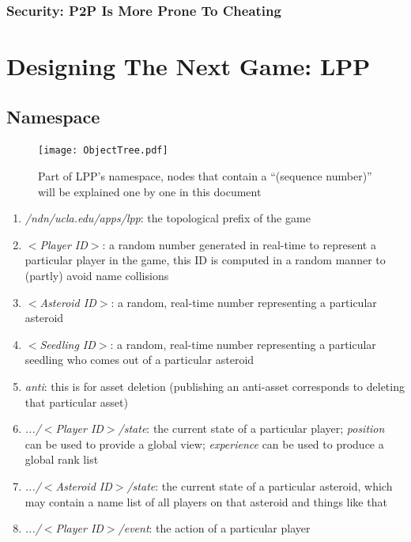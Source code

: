 \documentclass{article}
\begin{document}
\subsubsection{Security: P2P Is More Prone To Cheating}


\section{Designing The Next Game: LPP}
\label{sec:dslpp}

\subsection{Namespace}

\begin{figure}[htbp]
\begin{center}
\texttt{[image: ObjectTree.pdf]}
\caption{Part of LPP's namespace, nodes that contain a ``(sequence number)'' will be explained one by one in this document}
\label{ns}
\end{center}
\end{figure}

\begin{enumerate}
\item \emph{/ndn/ucla.edu/apps/lpp}: the topological prefix of the game
\item \emph{$<$Player ID$>$}: a random number generated in real-time to represent a particular player in the game, this ID is computed in a random manner to (partly) avoid name collisions
\item \emph{$<$Asteroid ID$>$}: a random, real-time number representing a particular asteroid
\item \emph{$<$Seedling ID$>$}: a random, real-time number representing a particular seedling who comes out of a particular asteroid
\item \emph{anti}: this is for asset deletion (publishing an anti-asset corresponds to deleting that particular asset)
\item \emph{.../$<$Player ID$>$/state}: the current state of a particular player; \emph{position} can be used to provide a global view; \emph{experience} can be used to produce a global rank list
\item \emph{.../$<$Asteroid ID$>$/state}: the current state of a particular asteroid, which may contain a name list of all players on that asteroid and things like that
\item \emph{.../$<$Player ID$>$/event}: the action of a particular player
\end{enumerate}
\end{document}
